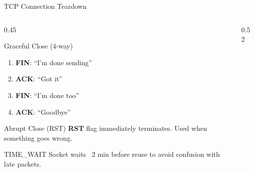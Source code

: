 \documentclass[aspectratio=169, 11pt]{beamer}
\begin{document}
\begin{frame}{TCP Connection Teardown}
    \begin{columns}[T]
        \begin{column}{0.45\textwidth}
            \begin{block}{Graceful Close (4-way)}
                \small
                \begin{enumerate}\setlength{\itemsep}{1pt}
                    \item \textbf{FIN}: ``I'm done sending''
                    \item \textbf{ACK}: ``Got it''
                    \item \textbf{FIN}: ``I'm done too''
                    \item \textbf{ACK}: ``Goodbye''
                \end{enumerate}
            \end{block}
            
            \vspace{0.2em}
            \begin{alertblock}{Abrupt Close (RST)}
                \small
                \textbf{RST} flag immediately terminates. Used when something goes wrong.
            \end{alertblock}
            
            \vspace{0.2em}
            \begin{exampleblock}{TIME\_WAIT}
                \small
                Socket waits ~2 min before reuse to avoid confusion with late packets.
            \end{exampleblock}
        \end{column}
        \begin{column}{0.52\textwidth}
            \begin{center}
\end{center}
\end{column}
\end{columns}
\end{frame}
\end{document}
